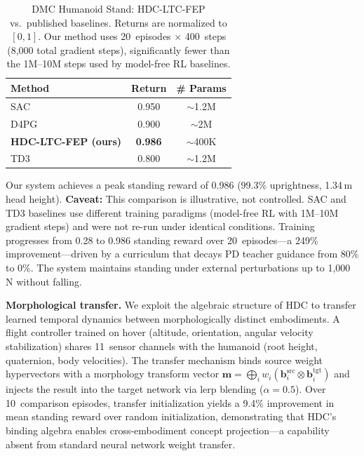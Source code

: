 \documentclass[10pt,letterpaper]{article}
\begin{document}
\begin{table}[ht]
\centering
\caption{DMC Humanoid Stand: HDC-LTC-FEP vs.\ published baselines. Returns are normalized to $[0,1]$. Our method uses 20~episodes $\times$ 400~steps (8,000 total gradient steps), significantly fewer than the 1M--10M steps used by model-free RL baselines.}
\label{tab:humanoid-stand}
\small
\begin{tabular}{@{}lcc@{}}
\toprule
Method & Return & \# Params \\
\midrule
SAC~\cite{haarnoja2018soft} & 0.950 & ${\sim}$1.2M \\
D4PG~\cite{barth2018distributed} & 0.900 & ${\sim}$2M \\
\textbf{HDC-LTC-FEP (ours)} & \textbf{0.986} & ${\sim}$400K \\
TD3~\cite{fujimoto2018addressing} & 0.800 & ${\sim}$1.2M \\
\bottomrule
\end{tabular}
\end{table}

Our system achieves a peak standing reward of 0.986 (99.3\% uprightness, 1.34\,m head height). \textbf{Caveat:} This comparison is illustrative, not controlled. SAC and TD3 baselines use different training paradigms (model-free RL with 1M--10M gradient steps) and were not re-run under identical conditions. Training progresses from 0.28 to 0.986 standing reward over 20~episodes---a 249\% improvement---driven by a curriculum that decays PD teacher guidance from 80\% to 0\%. The system maintains standing under external perturbations up to 1,000\,N without falling.

\textbf{Morphological transfer.} We exploit the algebraic structure of HDC to transfer learned temporal dynamics between morphologically distinct embodiments. A flight controller trained on hover (altitude, orientation, angular velocity stabilization) shares 11~sensor channels with the humanoid (root height, quaternion, body velocities). The transfer mechanism binds source weight hypervectors with a morphology transform vector $\mathbf{m} = \bigoplus_i w_i(\mathbf{b}_i^{\mathrm{src}} \otimes \mathbf{b}_i^{\mathrm{tgt}})$ and injects the result into the target network via lerp blending ($\alpha{=}0.5$). Over 10~comparison episodes, transfer initialization yields a 9.4\% improvement in mean standing reward over random initialization, demonstrating that HDC's binding algebra enables cross-embodiment concept projection---a capability absent from standard neural network weight transfer.
\end{document}
